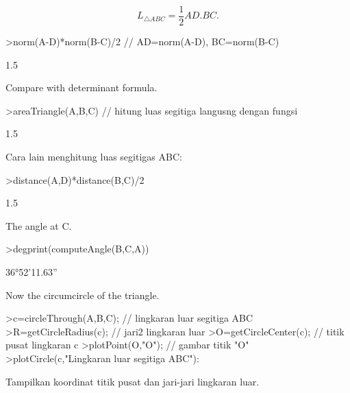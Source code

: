 \documentclass[a4paper,10pt]{article}
\begin{document}
\begin{eulernotebook}
\begin{eulercomment}
\end{eulercomment}
\begin{eulerformula}
\[
L_{\triangle ABC}= \frac{1}{2}AD.BC.
\]
\end{eulerformula}
\begin{eulerprompt}
>norm(A-D)*norm(B-C)/2 // AD=norm(A-D), BC=norm(B-C)
\end{eulerprompt}
\begin{euleroutput}
  1.5
\end{euleroutput}
\begin{eulercomment}
Compare with determinant formula.
\end{eulercomment}
\begin{eulerprompt}
>areaTriangle(A,B,C) // hitung luas segitiga langusng dengan fungsi
\end{eulerprompt}
\begin{euleroutput}
  1.5
\end{euleroutput}
\begin{eulercomment}
Cara lain menghitung luas segitigas ABC:
\end{eulercomment}
\begin{eulerprompt}
>distance(A,D)*distance(B,C)/2
\end{eulerprompt}
\begin{euleroutput}
  1.5
\end{euleroutput}
\begin{eulercomment}
The angle at C.
\end{eulercomment}
\begin{eulerprompt}
>degprint(computeAngle(B,C,A))
\end{eulerprompt}
\begin{euleroutput}
  36°52'11.63''
\end{euleroutput}
\begin{eulercomment}
Now the circumcircle of the triangle.
\end{eulercomment}
\begin{eulerprompt}
>c=circleThrough(A,B,C); // lingkaran luar segitiga ABC
>R=getCircleRadius(c); // jari2 lingkaran luar 
>O=getCircleCenter(c); // titik pusat lingkaran c 
>plotPoint(O,"O"); // gambar titik "O"
>plotCircle(c,"Lingkaran luar segitiga ABC"):
\end{eulerprompt}
\begin{eulercomment}
Tampilkan koordinat titik pusat dan jari-jari lingkaran luar.
\end{eulercomment}
\begin{eulerprompt}

\end{eulerprompt}
\end{eulernotebook}
\end{document}
